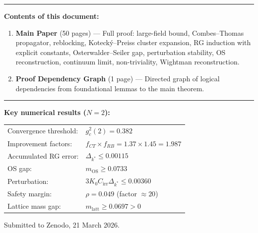\documentclass[12pt,a4paper]{article}
\begin{document}
\begin{center}
  \begin{minipage}{0.84\textwidth}
    \hrule\vspace{8pt}
    \textbf{Contents of this document:}
    \begin{enumerate}
      \item \textbf{Main Paper} (50 pages) --- Full proof: large-field bound,
            Combes--Thomas propagator, reblocking, Koteck\'y--Preiss cluster
            expansion, RG induction with explicit constants,
            Osterwalder--Seiler gap, perturbation stability,
            OS reconstruction, continuum limit, non-triviality,
            Wightman reconstruction.
      \item \textbf{Proof Dependency Graph} (1 page) --- Directed graph of
            logical dependencies from foundational lemmas to the main theorem.
    \end{enumerate}
    \vspace{4pt}\hrule
  \end{minipage}

  \vspace{1.5cm}

  \begin{minipage}{0.84\textwidth}
    \small
    \textbf{Key numerical results ($N=2$):}
    \begin{center}
    \begin{tabular}{ll}
      Convergence threshold: & $g^2_c(2) = 0.382$ \\
      Improvement factors:   & $f_{CT} \times f_{RB} = 1.37 \times 1.45 = 1.987$ \\
      Accumulated RG error:  & $\Delta_{k^*} \le 0.00115$ \\
      OS gap:                & $m_{\mathrm{OS}} \ge 0.0733$ \\
      Perturbation:          & $3K_0 C_{\mathrm{irr}}\Delta_{k^*} \le 0.00360$ \\
      Safety margin:         & $\rho = 0.049$ \quad (factor $\approx 20$) \\
      Lattice mass gap:      & $m_{\mathrm{latt}} \ge 0.0697 > 0$ \\
    \end{tabular}
    \end{center}
  \end{minipage}

  \vfill
  {\small Submitted to Zenodo, 21 March 2026.}
\end{center}

\clearpage




\end{document}
